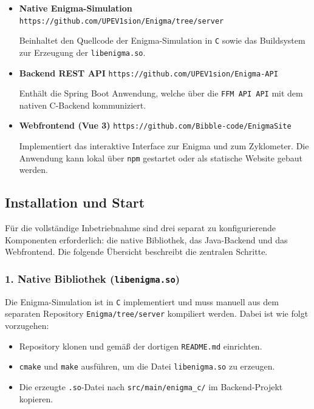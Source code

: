 \documentclass[12pt, ngerman, a4paper, numbers=noenddot]{article}
\begin{document}
\begin{itemize}

	
	\item \textbf{Native Enigma-Simulation}  
	\newline \lstinline|https://github.com/UPEV1sion/Enigma/tree/server|
	
	Beinhaltet den Quellcode der Enigma-Simulation in \lstinline|C| sowie das Buildsystem zur Erzeugung der \lstinline|libenigma.so|.
	
	\item \textbf{Backend REST API}  
	\newline \lstinline|https://github.com/UPEV1sion/Enigma-API|  
	
	Enthält die Spring Boot Anwendung, welche über die \newline\lstinline|FFM API API| mit dem nativen C-Backend kommuniziert.
	
	\item \textbf{Webfrontend (Vue 3)}  
	\newline \lstinline|https://github.com/Bibble-code/EnigmaSite|
	
	Implementiert das interaktive Interface zur Enigma und zum Zyklometer. Die Anwendung kann lokal über \lstinline|npm| gestartet oder als statische Website gebaut werden.
\end{itemize}

\newpage
\subsection*{Installation und Start}

Für die vollständige Inbetriebnahme sind drei separat zu konfigurierende Komponenten erforderlich: die native Bibliothek, das Java-Backend und das Webfrontend. Die folgende Übersicht beschreibt die zentralen Schritte.

\subsubsection*{1. Native Bibliothek (\texttt{libenigma.so})}

Die Enigma-Simulation ist in \lstinline|C| implementiert und muss manuell aus dem separaten Repository \lstinline|Enigma/tree/server| kompiliert werden.  
Dabei ist wie folgt vorzugehen:

\begin{itemize}
	\item Repository klonen und gemäß der dortigen \lstinline|README.md| einrichten.
	\item \lstinline|cmake| und \lstinline|make| ausführen, um die Datei \lstinline|libenigma.so| zu erzeugen.
	\item Die erzeugte \lstinline|.so|-Datei nach \lstinline|src/main/enigma_c/| im Backend-Projekt kopieren.
\end{itemize}
\end{document}
